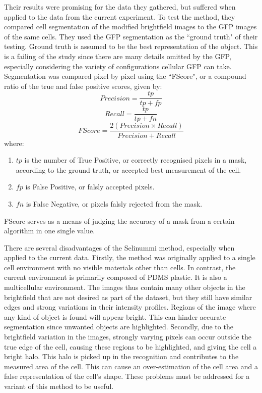 Their results were promising for the data they gathered, but suffered when applied to the data from the current experiment. To test the method, they compared cell segmentation of the modified brightfield images to the GFP images of the same cells. They used the GFP segmentation as the ``ground truth" of their testing. Ground truth is assumed to be the best representation of the object. This is a failing of the study since there are many details omitted by the GFP, especially considering the variety of configurations cellular GFP can take. Segmentation was compared pixel by pixel using the ``FScore", or a compound ratio of the true and false positive scores, given by:
$$ Precision = \frac{tp}{tp + fp} $$
$$ Recall = \frac{tp}{tp + fn} $$
$$ FScore = \frac{2 (Precision \times Recall) }{Precision + Recall} $$
where:
\begin{enumerate}
	\item $tp$ is the number of True Positive, or correctly recognised pixels in a mask, according to the ground truth, or accepted best measurement of the cell.
	\item $fp$ is False Positive, or falsly accepted pixels.
	\item $fn$ is False Negative, or pixels falsly rejected from the mask.
\end{enumerate}
FScore serves as a means of judging the accuracy of a mask from a certain algorithm in one single value.

There are several disadvantages of the Selinummi method, especially when applied to the current data. Firstly, the method was originally applied to a single cell environment with no visible materials other than cells. In contrast, the current environment is primarily composed of PDMS plastic. It is also a multicellular environment. The images thus contain many other objects in the brightfield that are not desired as part of the dataset, but they still have similar edges and strong variations in their intensity profiles. Regions of the image where any kind of object is found will appear bright. This can hinder accurate segmentation since unwanted objects are highlighted. Secondly, due to the brightfield variation in the images, strongly varying pixels can occur outside the true edge of the cell, causing these regions to be highlighted, and giving the cell a bright halo. This halo is picked up in the recognition and contributes to the measured area of the cell. This can cause an over-estimation of the cell area and a false representation of the cell's shape. These problems must be addressed for a variant of this method to be useful.
